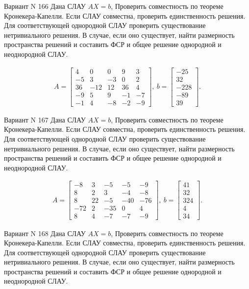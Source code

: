 \documentclass[11pt]{report}
\begin{document}
Вариант N 166
Дана СЛАУ $AX = b$,
Проверить совместность по теореме Кронекера-Капелли. Если СЛАУ совместна, проверить единственность решения.
Для соответствующей однородной СЛАУ проверить существование нетривиального решения. В случае, если оно существует,
найти размерность пространства решений и составить ФСР и общее решение однородной  и неоднородной СЛАУ.


\begin{align*}
 A = \left[\begin{matrix}4 & 0 & 0 & 9 & 3\\-5 & 3 & -3 & 0 & 2\\36 & -12 & 12 & 36 & 4\\-9 & 5 & 9 & -1 & -7\\-1 & 4 & -8 & -2 & -9\end{matrix}\right],
\ b = \left[\begin{matrix}-25\\32\\-228\\-89\\39\end{matrix}\right]. 
 \end{align*}

Вариант N 167
Дана СЛАУ $AX = b$,
Проверить совместность по теореме Кронекера-Капелли. Если СЛАУ совместна, проверить единственность решения.
Для соответствующей однородной СЛАУ проверить существование нетривиального решения. В случае, если оно существует,
найти размерность пространства решений и составить ФСР и общее решение однородной  и неоднородной СЛАУ.


\begin{align*}
 A = \left[\begin{matrix}-8 & 3 & -5 & -5 & -9\\8 & 2 & 3 & -4 & -8\\8 & 22 & -5 & -40 & -76\\-72 & 2 & -35 & 0 & 4\\8 & 4 & -7 & -7 & -9\end{matrix}\right],
\ b = \left[\begin{matrix}41\\32\\324\\4\\34\end{matrix}\right]. 
 \end{align*}

Вариант N 168
Дана СЛАУ $AX = b$,
Проверить совместность по теореме Кронекера-Капелли. Если СЛАУ совместна, проверить единственность решения.
Для соответствующей однородной СЛАУ проверить существование нетривиального решения. В случае, если оно существует,
найти размерность пространства решений и составить ФСР и общее решение однородной  и неоднородной СЛАУ.
\end{document}
